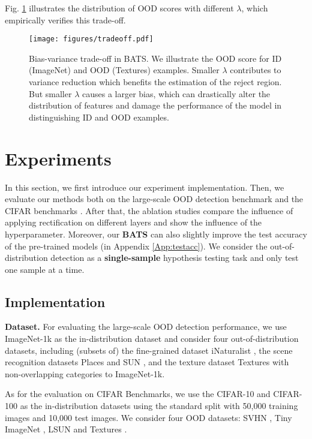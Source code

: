 \documentclass{article}
\begin{document}
Fig. \ref{img:tradeoff} illustrates the distribution of OOD scores with different $\lambda$, which empirically verifies this trade-off.
\begin{figure}[htbp]
\centering
\texttt{[image: figures/tradeoff.pdf]}
\caption{Bias-variance trade-off in BATS. We illustrate the OOD score for ID (ImageNet) and OOD (Textures) examples. Smaller $\lambda$ contributes to variance reduction which benefits the estimation of the reject region. But smaller $\lambda$ causes a larger bias, which can drastically alter the distribution of features and damage the performance of the model in distinguishing ID and OOD examples.}
\vspace{-0.3cm}
\label{img:tradeoff}
\end{figure}


\section{Experiments}
In this section, we first introduce our experiment implementation. Then, we evaluate our methods both on the large-scale OOD detection benchmark \cite{huang2021mos} and the CIFAR benchmarks \cite{hendrycks17baseline}. After that, the ablation studies compare the influence of applying rectification on different layers and show the influence of the hyperparameter. Moreover, our \textbf{BATS} can also slightly improve the test accuracy of the pre-trained models (in Appendix \ref{App:testacc}). We consider the out-of-distribution detection as a \textbf{single-sample} hypothesis testing task and only test one sample at a time.
\subsection{Implementation}
\textbf{Dataset.} 
For evaluating the large-scale OOD detection performance, we use ImageNet-1k \cite{huang2021mos} as the in-distribution dataset and consider four out-of-distribution datasets, including (subsets of) the fine-grained dataset iNaturalist \cite{van2018inaturalist}, the scene recognition datasets Places \cite{zhou2017places} and SUN \cite{xiao2010sun}, and the texture dataset Textures \cite{cimpoi2014Texture} with non-overlapping categories to ImageNet-1k. 

As for the evaluation on CIFAR Benchmarks, we use the CIFAR-10 and CIFAR-100 \cite{krizhevsky2009learningCIFAR} as the in-distribution datasets using the standard split with 50,000 training images and 10,000 test images. We consider four OOD datasets: SVHN \cite{netzer2011readingSVHN}, Tiny ImageNet \cite{chrabaszcz2017downsampledTiny}, LSUN \cite{yu2015lsun} and Textures \cite{cimpoi2014Texture}. 
\end{document}
